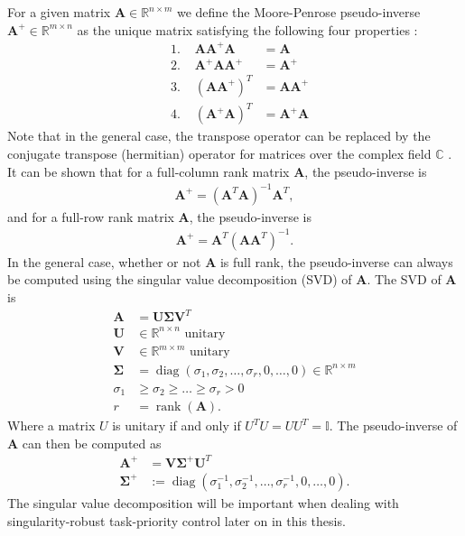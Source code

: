 For a given matrix $\bm{A} \in \mathbb{R}^{n\times m}$ we define the Moore-Penrose
pseudo-inverse $\bm{A}^{+} \in \mathbb{R}^{m\times n}$ as the unique matrix
satisfying the following four properties \cite{penrose1955}:
\begin{subequations}
    \begin{align}
        &\textrm{1. } & \bm{A}\bm{A}^{+}\bm{A} &= \bm{A} \\
        &\textrm{2. } & \bm{A}^{+}\bm{A}\bm{A}^{+} &= \bm{A}^{+} \\
        &\textrm{3. } & (\bm{A}\bm{A}^{+})^T &= \bm{A}\bm{A}^{+} \\
        &\textrm{4. } & (\bm{A}^{+}\bm{A})^T &= \bm{A}^{+}\bm{A}
    \end{align}
\end{subequations}
Note that in the general case, the transpose operator can be replaced by the
conjugate transpose (hermitian) operator for matrices over the complex field $\mathbb{C}$ \cite{penrose1955}.
It can be shown that for a full-column rank matrix $\bm{A}$, the pseudo-inverse is
\begin{align}
    \bm{A}^{+} = (\bm{A}^T \bm{A})^{-1} \bm{A}^T,
\end{align}
and for a full-row rank matrix $\bm{A}$, the pseudo-inverse is
\begin{align}
    \bm{A}^{+} = \bm{A}^T (\bm{A} \bm{A}^T)^{-1}.
\end{align}
In the general case, whether or not $\bm{A}$ is full rank, the pseudo-inverse can always
be computed using the singular value decomposition (SVD) of $\bm{A}$. The SVD of $\bm{A}$ is
\begin{subequations}
\begin{align}
    \bm{A} &= \bm{U} \bm{\Sigma} \bm{V}^T \\
    \bm{U} &\in \mathbb{R}^{n\times n} \textrm{ unitary} \\
    \bm{V} &\in \mathbb{R}^{m\times m} \textrm{ unitary} \\
    \bm{\Sigma} &= \operatorname{diag}(\sigma_1, \sigma_2, \ldots, \sigma_r, 0, \ldots, 0) \in \mathbb{R}^{n\times m} \\
    \sigma_1 &\geq \sigma_2 \geq \ldots \geq \sigma_r > 0 \\
    r &= \operatorname{rank}(\bm{A}).
\end{align}
\end{subequations}
Where a matrix $U$ is unitary if and only if $U^T U = U U^T = \mathbb{I}$. The pseudo-inverse
of $\bm{A}$ can then be computed as
\begin{subequations}
\begin{align}
    \bm{A}^{+} &= \bm{V} \bm{\Sigma}^{+} \bm{U}^T \\
    \bm{\Sigma}^{+} &:= \operatorname{diag}(\sigma_1^{-1}, \sigma_2^{-1}, \ldots, \sigma_r^{-1}, 0, \ldots, 0).
\end{align}
\end{subequations}
The singular value decomposition will be important when dealing with
singularity-robust task-priority control later on in this thesis.

